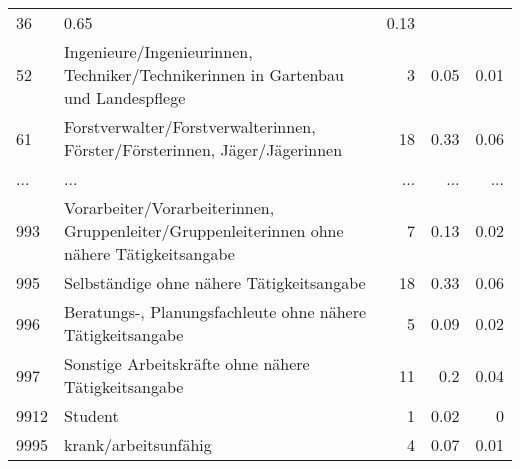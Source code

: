 \begin{longtable}{lXrrr}
          \num{36} &
          \num[round-mode=places,round-precision=2]{0.65} &
          \num[round-mode=places,round-precision=2]{0.13} \\
        52 & \multicolumn{1}{X}{Ingenieure/Ingenieurinnen, Techniker/Technikerinnen in Gartenbau und Landespflege} & %
          \num{3} &
          \num[round-mode=places,round-precision=2]{0.05} &
          \num[round-mode=places,round-precision=2]{0.01} \\
        61 & \multicolumn{1}{X}{Forstverwalter/Forstverwalterinnen, Förster/Försterinnen, Jäger/Jägerinnen} & %
          \num{18} &
          \num[round-mode=places,round-precision=2]{0.33} &
          \num[round-mode=places,round-precision=2]{0.06} \\
       ... & ... & ... & ... & ... \\
        993 & \multicolumn{1}{X}{Vorarbeiter/Vorarbeiterinnen, Gruppenleiter/Gruppenleiterinnen ohne nähere Tätigkeitsangabe} & %
          \num{7} &
          \num[round-mode=places,round-precision=2]{0.13} &
          \num[round-mode=places,round-precision=2]{0.02} \\

        995 & \multicolumn{1}{X}{Selbständige ohne nähere Tätigkeitsangabe} & %
          \num{18} &
          \num[round-mode=places,round-precision=2]{0.33} &
          \num[round-mode=places,round-precision=2]{0.06} \\

        996 & \multicolumn{1}{X}{Beratungs-, Planungsfachleute ohne nähere Tätigkeitsangabe} & %
          \num{5} &
          \num[round-mode=places,round-precision=2]{0.09} &
          \num[round-mode=places,round-precision=2]{0.02} \\

        997 & \multicolumn{1}{X}{Sonstige Arbeitskräfte ohne nähere Tätigkeitsangabe} & %
          \num{11} &
          \num[round-mode=places,round-precision=2]{0.2} &
          \num[round-mode=places,round-precision=2]{0.04} \\

        9912 & \multicolumn{1}{X}{Student} & %
          \num{1} &
          \num[round-mode=places,round-precision=2]{0.02} &
          \num[round-mode=places,round-precision=2]{0} \\

        9995 & \multicolumn{1}{X}{krank/arbeitsunfähig} & %
          \num{4} &
          \num[round-mode=places,round-precision=2]{0.07} &
          \num[round-mode=places,round-precision=2]{0.01} \\


\end{longtable}
